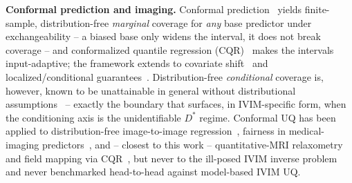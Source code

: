 \documentclass[11pt]{article}
\newcommand{\Dstar}{D^{*}}
\begin{document}
\textbf{Conformal prediction and imaging.} Conformal
prediction~\citep{vovk2005,lei2018,angelopoulos2023} yields finite-sample,
distribution-free \emph{marginal} coverage for \emph{any} base predictor under
exchangeability -- a biased base only widens the interval, it does not break
coverage -- and conformalized quantile regression (CQR)~\citep{romano2019} makes the
intervals input-adaptive; the framework extends to covariate
shift~\citep{tibshirani2019,barber2023} and localized/conditional
guarantees~\citep{guan2023,gibbs2023}. Distribution-free \emph{conditional} coverage
is, however, known to be unattainable in general without distributional
assumptions~\citep{barber2021limits} -- exactly the boundary that surfaces, in
IVIM-specific form, when the conditioning axis is the unidentifiable $\Dstar$
regime. Conformal UQ has been applied to distribution-free image-to-image
regression~\citep{angelopoulos2022}, fairness in medical-imaging
predictors~\citep{lu2022}, and -- closest to this work -- quantitative-MRI
relaxometry and field mapping via CQR~\citep{birk2024}, but never to the ill-posed
IVIM inverse problem and never benchmarked head-to-head against model-based IVIM UQ.
\end{document}
